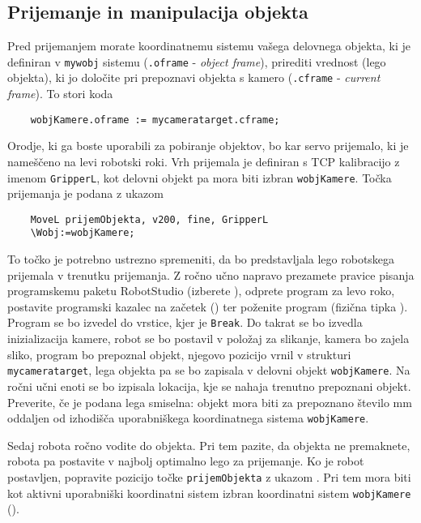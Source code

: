 \subsection{Prijemanje in manipulacija objekta}

Pred prijemanjem morate koordinatnemu sistemu vašega delovnega objekta, ki je definiran v  \verb"mywobj" sistemu (\verb".oframe" - \emph{object frame}), prirediti vrednost (lego objekta), ki jo določite pri prepoznavi objekta s kamero (\verb".cframe" - \emph{current frame}). To stori koda
\begin{verbatim}
	wobjKamere.oframe := mycameratarget.cframe;
\end{verbatim}

Orodje, ki ga boste uporabili za pobiranje objektov, bo kar servo prijemalo, ki je nameščeno na levi robotski roki. Vrh prijemala je definiran s TCP kalibracijo z imenom \verb"GripperL", kot delovni objekt pa mora biti izbran \verb"wobjKamere". Točka prijemanja je podana z ukazom
\begin{verbatim}
	MoveL prijemObjekta, v200, fine, GripperL
	\Wobj:=wobjKamere;
\end{verbatim}

To točko je potrebno ustrezno spremeniti, da bo predstavljala lego robotskega prijemala v trenutku prijemanja. Z ročno učno napravo prezamete pravice pisanja programskemu paketu RobotStudio (izberete ), odprete program za levo roko, postavite programski kazalec na začetek () ter poženite program (fizična tipka ). Program se bo izvedel do vrstice, kjer je \verb"Break". Do takrat se bo izvedla inizializacija kamere, robot se bo postavil v položaj za slikanje, kamera bo zajela sliko, program bo prepoznal objekt, njegovo pozicijo vrnil v strukturi \verb"mycameratarget", lega objekta pa se bo zapisala v delovni objekt \verb"wobjKamere". Na ročni učni enoti se bo izpisala lokacija, kje se nahaja trenutno prepoznani objekt. Preverite, če je podana lega smiselna: objekt mora biti za prepoznano število mm oddaljen od izhodišča uporabniškega koordinatnega sistema \verb"wobjKamere".

Sedaj robota ročno vodite do objekta. Pri tem pazite, da objekta ne premaknete, robota pa postavite v najbolj optimalno lego za prijemanje. Ko je robot postavljen, popravite pozicijo točke \verb"prijemObjekta" z ukazom . Pri tem mora biti kot aktivni uporabniški koordinatni sistem izbran koordinatni sistem \verb"wobjKamere" ().

